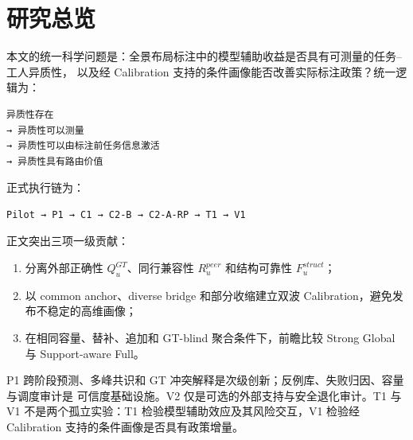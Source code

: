 \section{研究总览}

本文的统一科学问题是：全景布局标注中的模型辅助收益是否具有可测量的任务--工人异质性，
以及经 Calibration 支持的条件画像能否改善实际标注政策？统一逻辑为：

\begin{verbatim}
异质性存在
→ 异质性可以测量
→ 异质性可以由标注前任务信息激活
→ 异质性具有路由价值
\end{verbatim}

正式执行链为：

\begin{verbatim}
Pilot → P1 → C1 → C2-B → C2-A-RP → T1 → V1
\end{verbatim}

正文突出三项一级贡献：
\begin{enumerate}
  \item 分离外部正确性 \(Q^{GT}_u\)、同行兼容性 \(R^{peer}_u\) 和结构可靠性 \(F^{struct}_u\)；
  \item 以 common anchor、diverse bridge 和部分收缩建立双波 Calibration，避免发布不稳定的高维画像；
  \item 在相同容量、替补、追加和 GT-blind 聚合条件下，前瞻比较 Strong Global 与 Support-aware Full。
\end{enumerate}

P1 跨阶段预测、多峰共识和 GT 冲突解释是次级创新；反例库、失败归因、容量与调度审计是
可信度基础设施。V2 仅是可选的外部支持与安全退化审计。T1 与 V1 不是两个孤立实验：T1
检验模型辅助效应及其风险交互，V1 检验经 Calibration 支持的条件画像是否具有政策增量。
